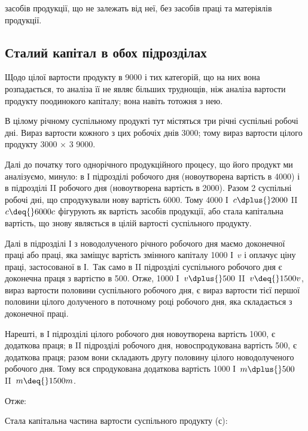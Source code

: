 \parcont{}  %
засобів продукції, що не залежать від неї, без засобів праці та матеріялів
продукції.

\subsection{Сталий капітал в обох підрозділах}

Щодо цілої вартости продукту в 9000 і тих категорій, що на них
вона розпадається, то аналіза її не являє більших труднощів, ніж аналіза
вартости продукту поодинокого капіталу; вона навіть тотожня з нею.

В цілому річному суспільному продукті тут містяться три річні суспільні
робочі дні. Вираз вартости кожного з цих робочіх днів \deq{} 3000; тому
вираз вартости цілого продукту 3000 × 3 \deq{} 9000.

Далі до початку того однорічного продукційного процесу, що його
продукт ми аналізуємо, минуло: в І підрозділі  робочого дня (новоутворена
вартість в 4000) і в підрозділі II  робочого дня (новоутворена
вартість в 2000). Разом 2 суспільні робочі дні, що спродукували
нову вартість \deq{} 6000. Тому 4000 І~$c \dplus{} 2000$ II~$c \deq{} 6000 c$ фігурують
як вартість засобів продукції, або стала капітальна вартість, що
знову являється в цілій вартості суспільного продукту.

Далі в підрозділі І з новодолученого річного робочого дня маємо 
доконечної праці або праці, яка заміщує вартість змінного капіталу 1000
І~$v$ і оплачує ціну праці, застосованої в І.~Так само в II підрозділі  суспільного
робочого дня є доконечна праця з вартістю в 500. Отже, 1000
I~$v \dplus{} 500$ II~$v \deq{} 1500 v$, вираз вартости половини суспільного робочого
дня, є вираз вартости тієї першої половини цілого долученого в поточному
році робочого дня, яка складається з доконечної праці.

Нарешті, в І підрозділі  цілого робочого дня новоутворена вартість \deq{}
1000, є додаткова праця; в II підрозділі  робочого дня, новоспродукована
вартість \deq{} 500, є додаткова праця; разом вони складають другу
половину цілого новодолученого робочого дня. Тому вся спродукована
додаткова вартість \deq{} 1000 І~$m \dplus{} 500$ II~$m \deq{} 1500 m$.

Отже:

Стала капітальна частина вартости суспільного продукту ($с$):

